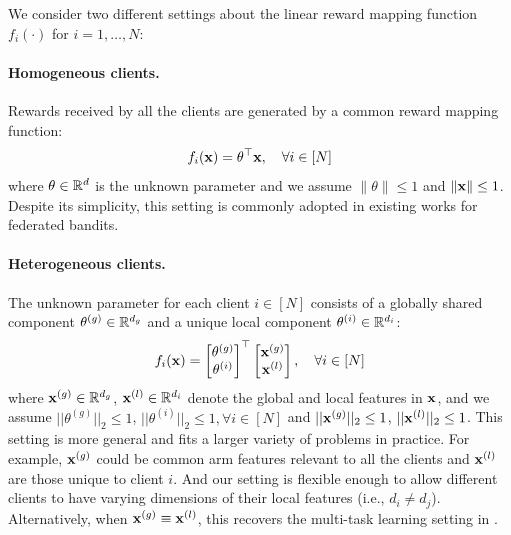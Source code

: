 We consider two different settings about the linear reward mapping function $f_{i}(\cdot)$ for $i=1,\dots,N$:

\paragraph{Homogeneous clients.}
Rewards received by all the clients are generated by a common reward mapping function:
    \begin{equation}\label{eq:homo_theta}
        f_{i}(\mathbf{x})=\theta^{\top} \mathbf{x}, \quad \forall i \in [N]
    \end{equation}
    where $\theta \in \mathbb{R}^{d}$ is the unknown parameter and we assume $\lVert \theta\rVert \leq 1$ and $\lVert \mathbf{x} \rVert \leq 1$. Despite its simplicity, this setting is commonly adopted in existing works for federated bandits.
\paragraph{Heterogeneous clients.}
The unknown parameter for each client $i\in [N]$ consists of a globally shared component $\theta^{(g)}\in \mathbb{R}^{d_{g}}$ and a unique local component $\theta^{(i)}\in \mathbb{R}^{d_{i}}$: 
    \begin{equation}\label{eq:hetero_theta}
        f_{i}(\mathbf{x})= \begin{bmatrix} \theta^{(g)} \\ \theta^{(i)} \end{bmatrix}^{\top} \begin{bmatrix} \mathbf{x}^{(g)} \\ \mathbf{x}^{(l)} \end{bmatrix} , \quad \forall i \in [N]
    \end{equation}
    where $\mathbf{x}^{(g)}\in \mathbb{R}^{d_{g}}$, $\mathbf{x}^{(l)}\in \mathbb{R}^{d_{i}}$ denote the global and local features in $\mathbf{x}$, and we assume $||\theta^{(g)}||_{2} \leq 1$, $||\theta^{(i)}||_{2} \leq 1, \forall i\in [N]$ and $||\mathbf{x}^{(g)}||_{2} \leq 1$, $||\mathbf{x}^{(l)}||_{2} \leq 1$. 
    This setting is more general and fits a larger variety of problems in practice. For example, $\mathbf{x}^{(g)}$ could be common arm features relevant to all the clients and $\mathbf{x}^{(l)}$ are those unique to client $i$. And our setting is flexible enough to allow different clients to have varying dimensions of their local features (i.e., $d_{i}\ne d_j$). Alternatively, when $\mathbf{x}^{(g)}\equiv\mathbf{x}^{(l)}$, this recovers the multi-task learning setting in \cite{evgeniou2004regularized}. 

